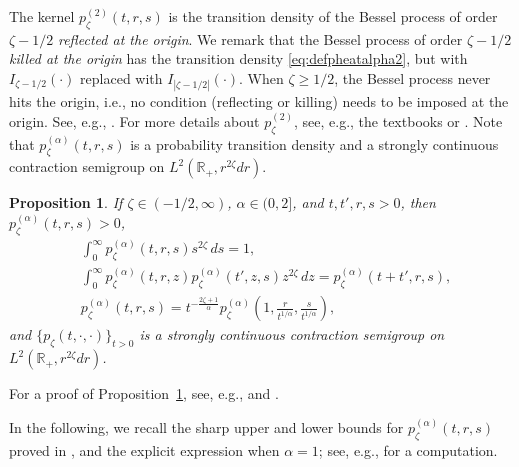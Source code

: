 \documentclass[12pt,reqno]{amsart}
\newtheorem{proposition}[theorem]{Proposition}
\theoremstyle{definition}
\theoremstyle{remark}
\numberwithin{equation}{section}
\newcommand{\1}{\mathbbm{1}}
\newcommand{\R}{\mathbb{R}}
\begin{document}
The kernel $p_\zeta^{(2)}(t,r,s)$ is the transition density of the Bessel process of order $\zeta-1/2$ \emph{reflected at the origin}. We remark that the Bessel process of order $\zeta-1/2$ \emph{killed at the origin} has the transition density \eqref{eq:defpheatalpha2}, but with $I_{\zeta-1/2}(\cdot)$ replaced with $I_{|\zeta-1/2|}(\cdot)$. When $\zeta\geq1/2$, the Bessel process never hits the origin, i.e., no condition (reflecting or killing) needs to be imposed at the origin. See, e.g., \cite{Maleckietal2016}. For more details about $p_\zeta^{(2)}$, see, e.g., the textbooks \cite[Part I, Section~IV.6 or Appendix~1.21]{BorodinSalminen2002} or \cite[Chapter~XI]{RevuzYor1999}.
%
Note that $p_\zeta^{(\alpha)}(t,r,s)$ is a probability transition density and a strongly continuous contraction semigroup on $L^2(\R_+,r^{2\zeta}dr)$.

\begin{proposition}
  \label{summarypropertiespzeta}
  If $\zeta\in(-1/2,\infty)$, $\alpha\in(0,2]$, and $t,t',r,s>0$, then $p_\zeta^{(\alpha)}(t,r,s)>0$,
  \begin{align}
    \label{eq:normalizedalpha}
    & \int_0^\infty p_\zeta^{(\alpha)}(t,r,s) s^{2\zeta}\,ds = 1, \\
    \label{eq:chapman}
    & \int_0^\infty p_\zeta^{(\alpha)}(t,r,z) p_\zeta^{(\alpha)}(t',z,s) z^{2\zeta}\,dz = p_\zeta^{(\alpha)}(t+t',r,s), \\
    \label{eq:scalingalpha}
    & p_\zeta^{(\alpha)}(t,r,s) = t^{-\frac{2\zeta+1}{\alpha}} p_\zeta^{(\alpha)}\left(1,\frac{r}{t^{1/\alpha}},\frac{s}{t^{1/\alpha}}\right),
  \end{align}
  and $\{p_\zeta(t,\cdot,\cdot)\}_{t>0}$ is a strongly continuous contraction semigroup on $L^2(\R_+,r^{2\zeta}dr)$.
\end{proposition}

For a proof of Proposition~\ref{summarypropertiespzeta}, see, e.g., \cite[Section~2]{BogdanMerz2024} and \cite[Lemma~1.4]{Bogdanetal2024}.

\smallskip
In the following, we recall the sharp upper and lower bounds for $p_\zeta^{(\alpha)}(t,r,s)$ proved in \cite{BogdanMerz2025}, and the explicit expression when $\alpha=1$; see, e.g., \cite[p.~136]{Betancoretal2010} for a computation.
\end{document}
